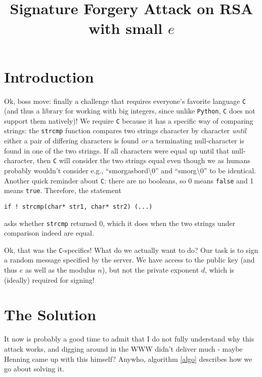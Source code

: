 \documentclass{article}
\title{Signature Forgery Attack on RSA with small $e$}
\begin{document}
\maketitle

\section{Introduction}

Ok, boss move: finally a challenge that requires everyone's favorite language \texttt{C} (and thus a library for working with big integers, since unlike \texttt{Python}, \texttt{C} does not support them natively)! We require \texttt{C} because it has a specific way of comparing strings: the \texttt{strcmp} function compares two strings character by character \emph{until} either a pair of differing characters is found \emph{or} a terminating null-character is found in one of the two strings. If all characters were equal up until that null-character, then \texttt{C} will consider the two strings equal even though we as humans probably wouldn't consider e.g., ``smorgasbord\textbackslash0'' and ``smorg\textbackslash0'' to be identical. Another quick reminder about \texttt{C}: there are no booleans, so 0 means \texttt{false} and 1 means \texttt{true}. Therefore, the statement 

\begin{center}
    \texttt{if ! strcmp(char* str1, char* str2) (...)}
\end{center}

asks whether \texttt{strcmp} returned 0, which it does when the two strings under comparison indeed are equal.

\medskip

Ok, that was the \texttt{C}-specifics! What do we actually want to do? Our task is to sign a random message specified by the server. We have access to the public key (and thus $e$ as well as the modulus $n$), but not the private exponent $d$, which is (ideally) required for signing!

\section{The Solution}

It now is probably a good time to admit that I do not fully understand why this attack works, and digging around in the WWW didn't deliver much - maybe Henning came up with this himself? Anywho, algorithm \ref{algo} describes how we go about solving it.
\end{document}
